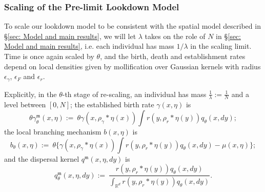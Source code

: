 \documentclass[12pt]{article}
\begin{document}
\subsubsection*{Scaling of the Pre-limit Lookdown Model}

To scale our lookdown model to be consistent with
the spatial model described in \S \ref{sec: Model and main results},
we will let $\lambda$ takes on the role of $N$
in \S \ref{sec: Model and main results},
i.e. each individual has mass $1/\lambda$
in the scaling limit.
Time is once again scaled by $\theta$,
and the birth, death and establishment rates 
depend on local densities given by
mollification over Gaussian kernels with radius
$\epsilon_{\gamma}$, $\epsilon_{F}$ and $\epsilon_{r}$.

Explicitly, in the $\theta$-th stage of re-scaling,
an individual has mass $\frac{1}{\lambda} := \frac{1}{N}$
and a level between $[0,N]$;
the established birth rate $\gamma(x,\eta)$ is
$$\theta\gamma^{\mathfrak{m}}_{\theta}(x, \eta)
:=~\theta\gamma(x, \rho_{\gamma}*\eta(x)) \int r(y, \rho_{r}*\eta(y))q_{\theta}(x,dy);$$
the local branching mechanism $b(x,\eta)$ is 
$$b_{\theta}(x, \eta):=~ \theta \bigg\{ \gamma(x, \rho_{\gamma}*\eta(x)) \int r(y, \rho_{r}*\eta(y))q_{\theta}(x,dy)-\mu(x, \eta)\bigg\};$$
and the dispersal kernel $q^{\mathfrak{m}}(x,\eta, dy)$ is 
$$q^{\mathfrak{m}}_{\theta}(x,\eta,dy) 
:=~ \frac{r(y,\rho_{r}*\eta(y)) q_{\theta}(x,dy)}{\int_{\mathbb{R}^d} r(y,\rho_{r}*\eta(y)) q_{\theta}(x,dy)}.$$
\end{document}
